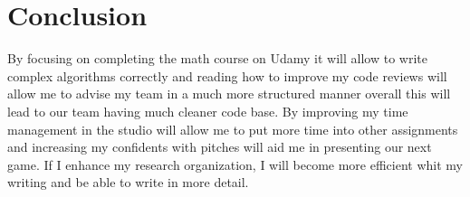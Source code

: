 \documentclass{scrartcl}
\begin{document}
\section{Conclusion}
By focusing on completing the math course on Udamy it will allow to write complex algorithms correctly and reading how to improve my code reviews will allow me to advise my team in a much more structured manner overall this will lead to our team having much cleaner code base. By improving my time management in the studio will allow me to put more time into other assignments and increasing my confidents with pitches will aid me in presenting our next game. If I enhance my research organization, I will become more efficient whit my writing and be able to write in more detail.




\end{document}
